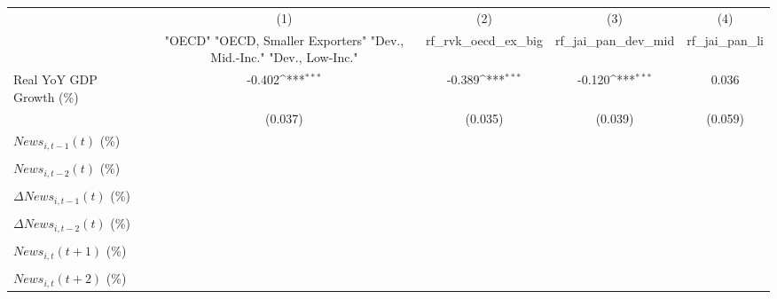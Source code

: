 {
\def\sym#1{\ifmmode^{#1}\else\(^{#1}\)\fi}
\begin{tabular}{l*{4}{c}}
\toprule
                    &\multicolumn{1}{c}{(1)}&\multicolumn{1}{c}{(2)}&\multicolumn{1}{c}{(3)}&\multicolumn{1}{c}{(4)}\\
                    &\multicolumn{1}{c}{ "OECD" "OECD, Smaller Exporters" "Dev., Mid.-Inc." "Dev., Low-Inc."}&\multicolumn{1}{c}{rf_rvk_oecd_ex_big}&\multicolumn{1}{c}{rf_jai_pan_dev_mid}&\multicolumn{1}{c}{rf_jai_pan_li}\\
\midrule
Real YoY GDP Growth (\%)&      -0.402\sym{***}&      -0.389\sym{***}&      -0.120\sym{***}&       0.036         \\
                    &     (0.037)         &     (0.035)         &     (0.039)         &     (0.059)         \\
\addlinespace
$ News_{i,t-1}(t)$ (\%)&                     &                     &                     &                     \\
                    &                     &                     &                     &                     \\
\addlinespace
$ News_{i,t-2}(t)$ (\%)&                     &                     &                     &                     \\
                    &                     &                     &                     &                     \\
\addlinespace
$ \Delta News_{i,t-1}(t)$ (\%)&                     &                     &                     &                     \\
                    &                     &                     &                     &                     \\
\addlinespace
$ \Delta News_{i,t-2}(t)$ (\%)&                     &                     &                     &                     \\
                    &                     &                     &                     &                     \\
\addlinespace
$ News_{i,t}(t+1)$ (\%)&                     &                     &                     &                     \\
                    &                     &                     &                     &                     \\
\addlinespace
$ News_{i,t}(t+2)$ (\%)&                     &                     &                     &                     \\

\end{tabular}}
